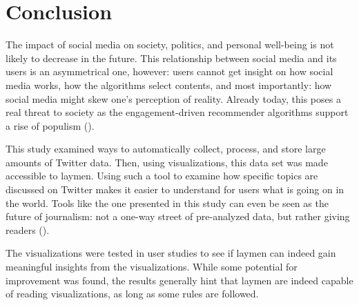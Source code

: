 \section{Conclusion}
The impact of social media on society, politics, and personal well-being is not likely to decrease in the future. This relationship between social media and its users is an asymmetrical one, however: users cannot get insight on how social media works, how the algorithms select contents, and most importantly: how social media might skew one's perception of reality. Already today, this poses a real threat to society as the engagement-driven recommender algorithms support a rise of populism (\cite{groshekHelpingPopulismWin2017}).

This study examined ways to automatically collect, process, and store large amounts of Twitter data. Then, using visualizations, this data set was made accessible to laymen. Using such a tool to examine how specific topics are discussed on Twitter makes it easier to understand for users what is going on in the world. Tools like the one presented in this study can even be seen as the future of journalism: not a one-way street of pre-analyzed data, but rather giving readers  (\cite{angwinMakingPrivacyPersonal2020}).

The visualizations were tested in user studies to see if laymen can indeed gain meaningful insights from the visualizations. While some potential for improvement was found, the results generally hint that laymen are indeed capable of reading visualizations, as long as some rules are followed.






